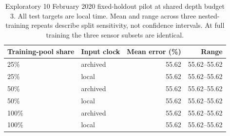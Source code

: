 \begin{table}[htbp]\centering
\caption{Exploratory 10 February 2020 fixed-holdout pilot at shared depth budget 3. All test targets are local time. Mean and range across three nested-training repeats describe split sensitivity, not confidence intervals. At full training the three sensor subsets are identical.}
\label{tab:sensor-pilot}
\begin{tabular}{@{}llrr@{}}\toprule
Training-pool share & Input clock & Mean error (\%) & Range \\\midrule
25\% & archived & 55.62 & 55.62--55.62 \\
25\% & local & 55.62 & 55.62--55.62 \\
50\% & archived & 55.62 & 55.62--55.62 \\
50\% & local & 55.62 & 55.62--55.62 \\
100\% & archived & 55.62 & 55.62--55.62 \\
100\% & local & 55.62 & 55.62--55.62 \\
\bottomrule\end{tabular}\end{table}
